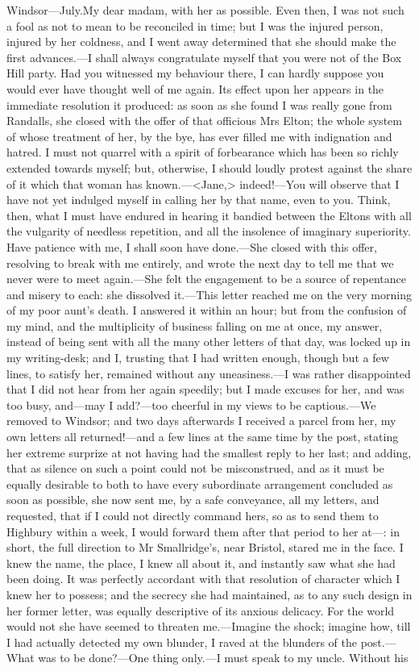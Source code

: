 \begin{mail}{Windsor—July.}{My dear madam,}
with her as possible. Even then, I was not such a fool as not to mean to be reconciled in time; but I was the injured person, injured by her coldness, and I went away determined that she should make the first advances.—I shall always congratulate myself that you were not of the Box Hill party. Had you witnessed my behaviour there, I can hardly suppose you would ever have thought well of me again. Its effect upon her appears in the immediate resolution it produced: as soon as she found I was really gone from Randalls, she closed with the offer of that officious Mrs Elton; the whole system of whose treatment of her, by the bye, has ever filled me with indignation and hatred. I must not quarrel with a spirit of forbearance which has been so richly extended towards myself; but, otherwise, I should loudly protest against the share of it which that woman has known.—<Jane,> indeed!—You will observe that I have not yet indulged myself in calling her by that name, even to you. Think, then, what I must have endured in hearing it bandied between the Eltons with all the vulgarity of needless repetition, and all the insolence of imaginary superiority. Have patience with me, I shall soon have done.—She closed with this offer, resolving to break with me entirely, and wrote the next day to tell me that we never were to meet again.—She felt the engagement to be a source of repentance and misery to each: she dissolved it.—This letter reached me on the very morning of my poor aunt's death. I answered it within an hour; but from the confusion of my mind, and the multiplicity of business falling on me at once, my answer, instead of being sent with all the many other letters of that day, was locked up in my writing-desk; and I, trusting that I had written enough, though but a few lines, to satisfy her, remained without any uneasiness.—I was rather disappointed that I did not hear from her again speedily; but I made excuses for her, and was too busy, and—may I add?—too cheerful in my views to be captious.—We removed to Windsor; and two days afterwards I received a parcel from her, my own letters all returned!—and a few lines at the same time by the post, stating her extreme surprize at not having had the smallest reply to her last; and adding, that as silence on such a point could not be misconstrued, and as it must be equally desirable to both to have every subordinate arrangement concluded as soon as possible, she now sent me, by a safe conveyance, all my letters, and requested, that if I could not directly command hers, so as to send them to Highbury within a week, I would forward them after that period to her at—: in short, the full direction to Mr Smallridge's, near Bristol, stared me in the face. I knew the name, the place, I knew all about it, and instantly saw what she had been doing. It was perfectly accordant with that resolution of character which I knew her to possess; and the secrecy she had maintained, as to any such design in her former letter, was equally descriptive of its anxious delicacy. For the world would not she have seemed to threaten me.—Imagine the shock; imagine how, till I had actually detected my own blunder, I raved at the blunders of the post.—What was to be done?—One thing only.—I must speak to my uncle. Without his 
\end{mail}
